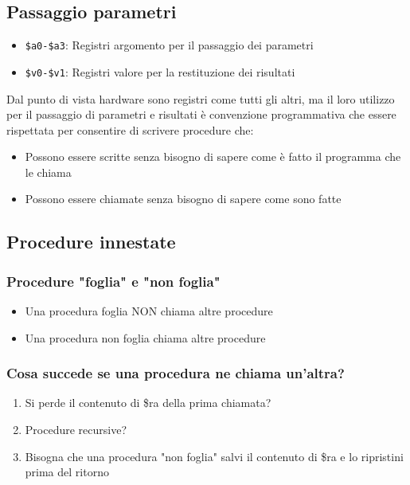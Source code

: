 \subsection{Passaggio parametri}
\begin{itemize}
    \item \texttt{\$a0-\$a3}: Registri argomento per il passaggio dei parametri
    \item \texttt{\$v0-\$v1}: Registri valore per la restituzione dei risultati
\end{itemize}

Dal punto di vista hardware sono registri come tutti gli altri, ma il loro utilizzo per il passaggio di parametri e risultati è convenzione programmativa che essere rispettata per consentire di scrivere procedure che:
\begin{itemize}
    \item Possono essere scritte senza bisogno di sapere come è fatto il programma che le chiama
    \item Possono essere chiamate senza bisogno di sapere come sono fatte
\end{itemize}

\subsection{Procedure innestate}
\subsubsection{Procedure "foglia" e "non foglia"}
\begin{itemize}
    \item Una procedura foglia NON chiama altre procedure
    \item Una procedura non foglia  chiama altre procedure
\end{itemize}

\subsubsection{Cosa succede se una procedura ne chiama un'altra?}
\begin{enumerate}
    \item Si perde il contenuto di \$ra della prima chiamata?
    \item Procedure recursive?
    \item Bisogna che una procedura "non foglia" salvi il contenuto di \$ra e lo ripristini prima del ritorno
\end{enumerate}

